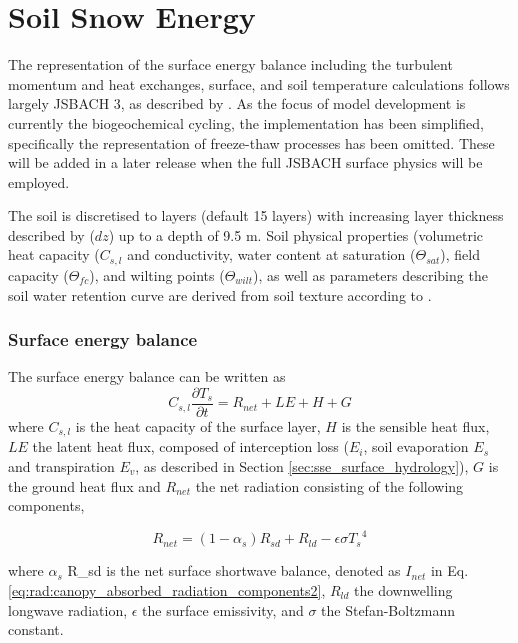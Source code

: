 \chapter{Soil Snow Energy}\label{ch:sse}

The representation of the surface energy balance including the turbulent momentum and heat exchanges, surface, and soil temperature calculations follows largely JSBACH 3, as described by \cite{Roeckner:2003wc}. As the focus of model development is currently the biogeochemical cycling, the implementation has been simplified, specifically the representation of freeze-thaw processes has been omitted. These will be added in a later release when the full JSBACH surface physics will be employed.

The soil is discretised to layers (default 15 layers) with increasing layer thickness described by ($dz$) up to a depth of 9.5 m. Soil physical properties (volumetric heat capacity ($C_{s,l}$ and conductivity, water content at saturation ($\Theta_{sat}$), field capacity ($\Theta_{fc}$), and wilting points ($\Theta_{wilt}$), as well as parameters describing the soil water retention curve are derived from soil texture according to \cite{Saxton:2006jb}. 

\subsection{Surface energy balance}

The surface energy balance can be written as
\begin{equation}\label{eq:sse_surface_energy_balance}
C_{s,l} \frac{\partial T_s}{\partial t} = R_{net} + LE + H + G
\end{equation}
where $C_{s,l}$ is the heat capacity of the surface layer, $H$ is the sensible heat flux, $LE$ the latent heat flux, composed of interception loss ($E_i$, soil evaporation $E_s$ and transpiration $E_v$, as described in Section \ref{sec:sse_surface_hydrology}), $G$ is the ground heat flux and $R_{net}$ the net radiation consisting of the following components,

\begin{equation}
R_{net} = (1 - \alpha_s ) R_{sd} + R_{ld} - \epsilon \sigma {T_s}^4
\end{equation} 

where $\alpha_s$ R\_{sd} is the net surface shortwave balance, denoted as $I_{net}$ in Eq. \ref{eq:rad:canopy_absorbed_radiation_components2}, $R_{ld}$ the downwelling longwave radiation, $\epsilon$ the surface emissivity, and $\sigma$ the Stefan-Boltzmann constant. 

